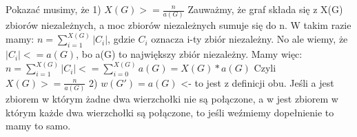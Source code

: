 \documentclass[12pt]{article}
\begin{document}
Pokazać musimy, że 
1) $X(G) >= \frac{n}{a(G)}$ 
Zauważmy, że graf składa się z X(G) zbiorów niezależnych, a moc zbiorów niezależnych sumuje się do n.
W takim razie mamy:
$n = \sum_{i=1}^{X(G)} |C_i|$, gdzie $C_i$ oznacza i-ty zbiór niezależny.
No ale wiemy, że $|C_i| <= a(G)$, bo a(G) to największy zbiór niezależny.
Mamy więc:
$n = \sum_{i=1}^{X(G)} |C_i| <= \sum_{i=0}^{X(G)} a(G) = X(G)*a(G)$
Czyli $X(G) >= \frac{n}{a(G)}$
2) $w(G') = a(G)$ <- to jest z definicji obu. Jeśli a jest zbiorem w którym żadne dwa wierzchołki nie są połączone, a w jest zbiorem w którym każde dwa wierzchołki są połączone, to jeśli weźmiemy dopełnienie to mamy to samo.
\egroup
\end{document}
